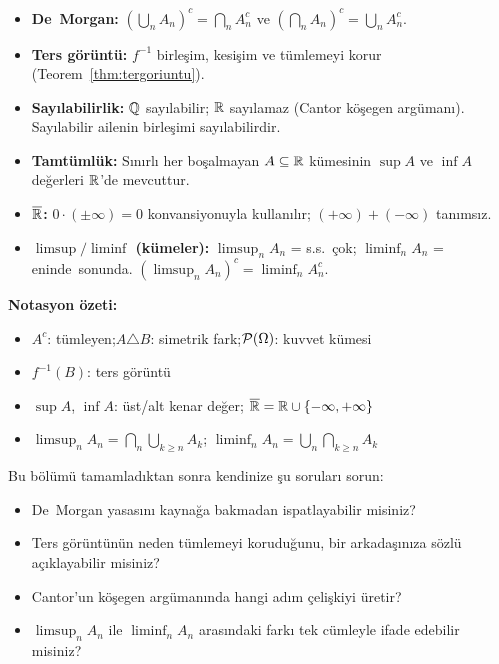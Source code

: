\begin{bolumozeti}
\begin{itemize}
  \item \textbf{De~Morgan:}
        $\left(\bigcup_n A_n\right)^c = \bigcap_n A_n^c$ ve
        $\left(\bigcap_n A_n\right)^c = \bigcup_n A_n^c$.
  \item \textbf{Ters görüntü:} $f^{-1}$ birleşim, kesişim ve tümlemeyi korur
        (Teorem~\ref{thm:tergoriuntu}).
  \item \textbf{Sayılabilirlik:} $\mathbb{Q}$ sayılabilir; $\mathbb{R}$ sayılamaz (Cantor köşegen argümanı).
        Sayılabilir ailenin birleşimi sayılabilirdir.
  \item \textbf{Tamtümlük:} Sınırlı her boşalmayan $A \subseteq \mathbb{R}$ kümesinin
        $\sup A$ ve $\inf A$ değerleri $\mathbb{R}$'de mevcuttur.
  \item \textbf{$\overline{\mathbb{R}}$:} $0 \cdot (\pm\infty) = 0$ konvansiyonuyla kullanılır;
        $(+\infty)+(-\infty)$ tanımsız.
  \item \textbf{$\limsup / \liminf$ (kümeler):}
        $\limsup_n A_n$ = s.s.~çok; $\liminf_n A_n$ = eninde~sonunda.
        $\left(\limsup_n A_n\right)^c = \liminf_n A_n^c$.
\end{itemize}

\medskip\noindent\textbf{Notasyon özeti:}
\begin{itemize}
  \item $A^c$: tümleyen;\quad $A \triangle B$: simetrik fark;\quad $\mathcal{P}(\Omega)$: kuvvet kümesi
  \item $f^{-1}(B)$: ters görüntü
  \item $\sup A$, $\inf A$: üst/alt kenar değer;\quad
        $\overline{\mathbb{R}} = \mathbb{R} \cup \{-\infty, +\infty\}$
  \item $\limsup_n A_n = \bigcap_n \bigcup_{k \geq n} A_k$;\quad
        $\liminf_n A_n = \bigcup_n \bigcap_{k \geq n} A_k$
\end{itemize}
\end{bolumozeti}

\begin{ozyansima}
Bu bölümü tamamladıktan sonra kendinize şu soruları sorun:
\begin{itemize}
  \item De~Morgan yasasını kaynağa bakmadan ispatlayabilir misiniz?
  \item Ters görüntünün neden tümlemeyi koruduğunu, bir arkadaşınıza sözlü
        açıklayabilir misiniz?
  \item Cantor'un köşegen argümanında hangi adım çelişkiyi üretir?
  \item $\limsup_n A_n$ ile $\liminf_n A_n$ arasındaki farkı tek cümleyle
        ifade edebilir misiniz?
\end{itemize}
\end{ozyansima}

